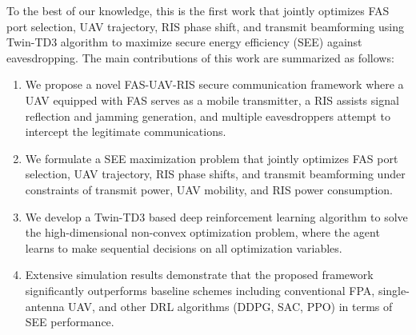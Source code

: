 To the best of our knowledge, this is the first work that jointly optimizes FAS port selection, UAV trajectory, RIS phase shift, and transmit beamforming using Twin-TD3 algorithm to maximize secure energy efficiency (SEE) against eavesdropping. The main contributions of this work are summarized as follows:
\begin{enumerate}
    \item We propose a novel FAS-UAV-RIS secure communication framework where a UAV equipped with FAS serves as a mobile transmitter, a RIS assists signal reflection and jamming generation, and multiple eavesdroppers attempt to intercept the legitimate communications.
    \item We formulate a SEE maximization problem that jointly optimizes FAS port selection, UAV trajectory, RIS phase shifts, and transmit beamforming under constraints of transmit power, UAV mobility, and RIS power consumption.
    \item We develop a Twin-TD3 based deep reinforcement learning algorithm to solve the high-dimensional non-convex optimization problem, where the agent learns to make sequential decisions on all optimization variables.
    \item Extensive simulation results demonstrate that the proposed framework significantly outperforms baseline schemes including conventional FPA, single-antenna UAV, and other DRL algorithms (DDPG, SAC, PPO) in terms of SEE performance.
\end{enumerate}

